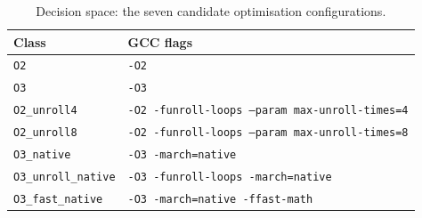 \begin{table}[H]
\centering
\caption{Decision space: the seven candidate optimisation configurations.}
\label{tab:configs}
\small

\begin{tabular}{ll}
\toprule
\textbf{Class} & \textbf{GCC flags} \\
\midrule
\texttt{O2} & \texttt{-O2} \\
\texttt{O3} & \texttt{-O3} \\
\texttt{O2\_unroll4} & \texttt{-O2 -funroll-loops --param max-unroll-times=4} \\
\texttt{O2\_unroll8} & \texttt{-O2 -funroll-loops --param max-unroll-times=8} \\
\texttt{O3\_native} & \texttt{-O3 -march=native} \\
\texttt{O3\_unroll\_native} & \texttt{-O3 -funroll-loops -march=native} \\
\texttt{O3\_fast\_native} & \texttt{-O3 -march=native -ffast-math} \\
\bottomrule
\end{tabular}
\end{table}
